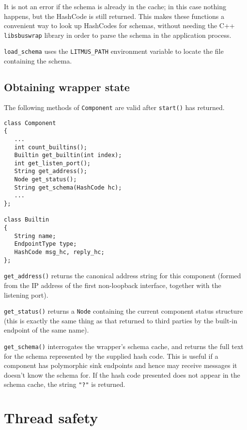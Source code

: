 \documentclass[12pt,a4paper,twoside]{article}
\renewcommand{\_}{\texttt{\symbol{95}}}
\begin{document}
It is not an error if the schema is already in the cache; in this
case nothing happens, but the HashCode is still returned. This makes
these functions a convenient way to look up HashCodes for schemas,
without needing the C++ \verb^libsbuswrap^ library in order to parse the
schema in the application process.

\verb^load_schema^ uses the \verb^LITMUS_PATH^ environment variable
to locate the file containing the schema.


\subsection{Obtaining wrapper state}

The following methods of \verb^Component^ are valid after
\verb^start()^ has returned.

\begin{verbatim}
class Component
{
   ...
   int count_builtins();
   Builtin get_builtin(int index);
   int get_listen_port();
   String get_address();
   Node get_status();
   String get_schema(HashCode hc);
   ...
};

class Builtin
{
   String name;
   EndpointType type;
   HashCode msg_hc, reply_hc;
};
\end{verbatim}

\verb^get_address()^ returns the canonical address string for this
component (formed from the IP address of the first non-loopback interface,
together with the listening port).

\verb^get_status()^ returns a \verb^Node^ containing the current
component status structure (this is exactly the same thing as that
returned to third parties by the built-in endpoint of the same name).

\verb^get_schema()^ interrogates the wrapper's schema cache, and
returns the full text for the schema represented by the supplied
hash code. This is useful if a component has polymorphic sink
endpoints and hence may receive messages it doesn't know the schema
for. If the hash code presented does not appear in the schema
cache, the string \verb^"?"^ is returned.

\section{Thread safety}
\end{document}
